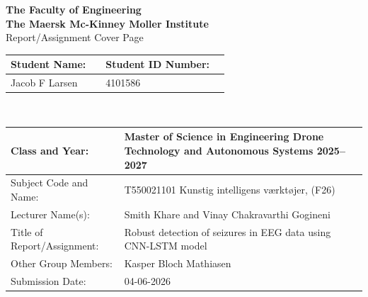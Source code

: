 \begin{titlepage}
    \begin{figure}
        \centering
    \end{figure}
    
    \vspace*{0.5cm}
    
    \centering
    \textbf{\Large The Faculty of Engineering} \\
    \textbf{\Large The Maersk Mc-Kinney Moller Institute} \\
    {\Large Report/Assignment Cover Page} \\[0.5cm]

    \begin{tabularx}{\textwidth}{|lX|lX|}
    \hline
    \textbf{Student Name:} & & \textbf{Student ID Number:} & \\
    \hline
    Jacob F Larsen & & 4101586 & \\
    \hline
    \end{tabularx}\\[0.7cm]

    \begin{tabularx}{\textwidth}{|l|X|}
    \hline
    Class and Year: & Master of Science in Engineering Drone Technology and Autonomous Systems 2025--2027 \\
    \hline
    Subject Code and Name: & T550021101 Kunstig intelligens værktøjer, (F26) \\
    \hline
    Lecturer Name(s): & Smith Khare and Vinay Chakravarthi Gogineni \\
    \hline
    Title of Report/Assignment: & Robust detection of seizures in EEG data using CNN-LSTM model \\
    \hline
    Other Group Members: & Kasper Bloch Mathiasen \\
    \hline
    Submission Date: & 04-06-2026 \\
    \hline
    \end{tabularx}\\[1cm]
    

\end{titlepage}
